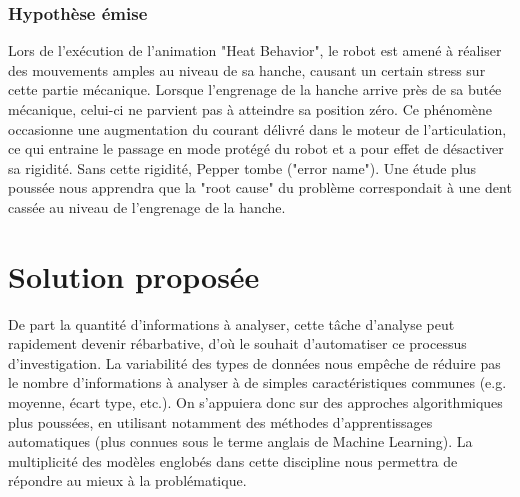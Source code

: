\subsubsection{Hypothèse émise}
 Lors de l'exécution de l'animation "Heat Behavior", le robot est amené à réaliser des mouvements amples au niveau de sa hanche, causant un certain stress sur cette partie mécanique. Lorsque l'engrenage de la hanche arrive près de sa butée mécanique, celui-ci ne parvient pas à atteindre sa position zéro. Ce phénomène occasionne une augmentation du courant délivré dans le moteur de l'articulation, ce qui entraine le passage en mode protégé du robot et a pour effet de désactiver sa rigidité. Sans cette rigidité, Pepper tombe ("error name"). Une étude plus poussée nous apprendra que la "root cause" du problème correspondait à une dent cassée au niveau de l'engrenage de la hanche. 


\section{Solution proposée}
De part la quantité d'informations à analyser, cette tâche d'analyse peut rapidement devenir rébarbative, d'où le souhait d'automatiser ce processus d'investigation. La variabilité des types de données nous empêche de réduire pas le nombre d'informations à analyser à de simples caractéristiques communes (e.g. moyenne, écart type, etc.). On s'appuiera donc sur des approches algorithmiques plus poussées, en utilisant notamment des méthodes d'apprentissages automatiques (plus connues sous le terme anglais de Machine Learning). La multiplicité des modèles englobés dans cette discipline nous permettra de répondre au mieux à la problématique.